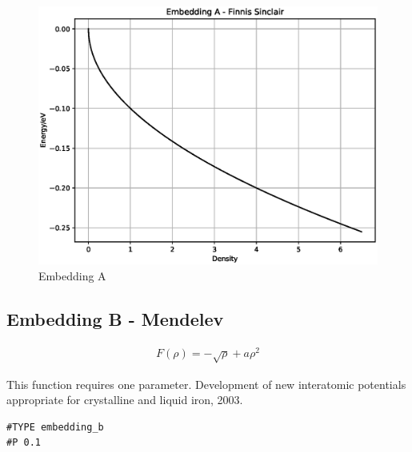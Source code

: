 \FloatBarrier
\begin{figure}[h]
  \begin{center}
    \includegraphics[scale=0.5]{appendix/functions/plots/embedding_a.eps}
    \caption{Embedding A}
    \label{graph:graph1}
  \end{center}
\end{figure}
\FloatBarrier








\subsection{Embedding B - Mendelev}

\begin{equation}
\begin{split}
F(\rho) = -\sqrt{\rho} + a \rho^2
\end{split}
\label{eq:mendelevEmbedding}
\end{equation}

This function requires one parameter. 
Development of new interatomic potentials appropriate for crystalline and liquid iron, 2003.

\begin{lstlisting}[style=pseudocode,caption={Embedding B}]
#TYPE embedding_b
#P 0.1
\end{lstlisting}

